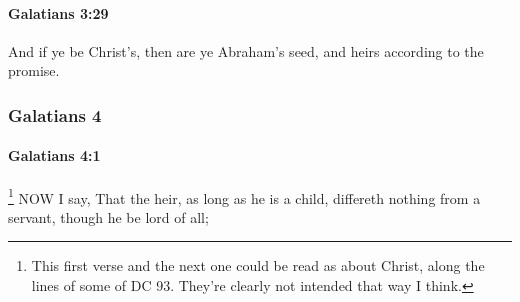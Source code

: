		\paragraph{Galatians 3:29} %
			\label{GALATIANS-3-29}

			And if ye be Christ's, then are ye Abraham's seed, and heirs according to the promise.

			\begin{framed}
			\scriptsize
				\begin{compactdesc}
					\item[SBLG] 
				\end{compactdesc}
			\end{framed}

	\subsubsection{Galatians 4} %
		\label{GALATIANS-4}
		
		\paragraph{Galatians 4:1} %
			\label{GALATIANS-4-1}

				\footnote{%
					This first verse and the next one could be read as about Christ, along the lines of some of DC 93. They're clearly not intended that way I think.
					}%
			NOW I say, That the heir, as long as he is a child, differeth nothing from a servant, though he be lord of all;

